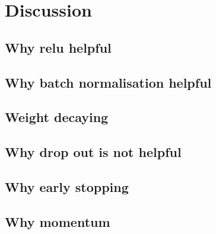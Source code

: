 \section{Discussion}
\subsection{Why relu helpful}
\subsection{Why batch normalisation helpful}
\subsection{Weight decaying}
\subsection{Why drop out is not helpful}
\subsection{Why early stopping}
\subsection{Why momentum}
